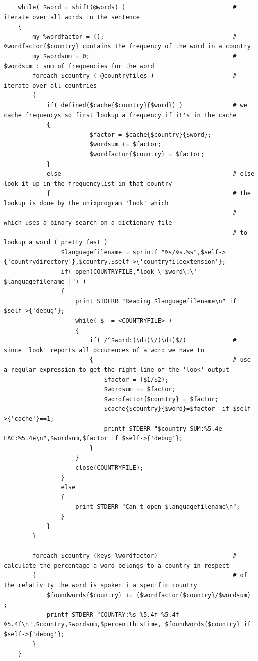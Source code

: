 \begin{verbatim}
    while( $word = shift(@words) )                              # iterate over all words in the sentence
    {
        my %wordfactor = ();                                    # %wordfactor{$country} contains the frequency of the word in a country
        my $wordsum = 0;                                        # $wordsum : sum of frequencies for the word
        foreach $country ( @countryfiles )                      # iterate over all countries
        {                                                       
            if( defined($cache{$country}{$word}) )              # we cache frequencys so first lookup a frequency if it's in the cache
            {
                        $factor = $cache{$country}{$word};
                        $wordsum += $factor;
                        $wordfactor{$country} = $factor;            
            }
            else                                                # else look it up in the frequencylist in that country
            {                                                   # the lookup is done by the unixprogram 'look' which
                                                                # which uses a binary search on a dictionary file
                                                                # to lookup a word ( pretty fast )
                $languagefilename = sprintf "%s/%s.%s",$self->{'countrydirectory'},$country,$self->{'countryfileextension'};
                if( open(COUNTRYFILE,"look \'$word\:\' $languagefilename |") )      
                {
                    print STDERR "Reading $languagefilename\n" if $self->{'debug'};
                    while( $_ = <COUNTRYFILE> )
                    {
                        if( /^$word:(\d+)\/(\d+)$/)             # since 'look' reports all occurences of a word we have to
                        {                                       # use a regular expression to get the right line of the 'look' output
                            $factor = ($1/$2);
                            $wordsum += $factor;
                            $wordfactor{$country} = $factor;
                            $cache{$country}{$word}=$factor  if $self->{'cache'}==1;
                            printf STDERR "$country SUM:%5.4e FAC:%5.4e\n",$wordsum,$factor if $self->{'debug'};
                        }
                    }
                    close(COUNTRYFILE);
                }
                else
                {
                    print STDERR "Can't open $languagefilename\n";
                }
            }
        }
        
        foreach $country (keys %wordfactor)                     # calculate the percentage a word belongs to a country in respect
        {                                                       # of the relativity the word is spoken i a specific country
            $foundwords{$country} += ($wordfactor{$country}/$wordsum) ;
            printf STDERR "COUNTRY:%s %5.4f %5.4f %5.4f\n",$country,$wordsum,$percentthistime, $foundwords{$country} if $self->{'debug'};
        }       
    }
        

\end{verbatim}
